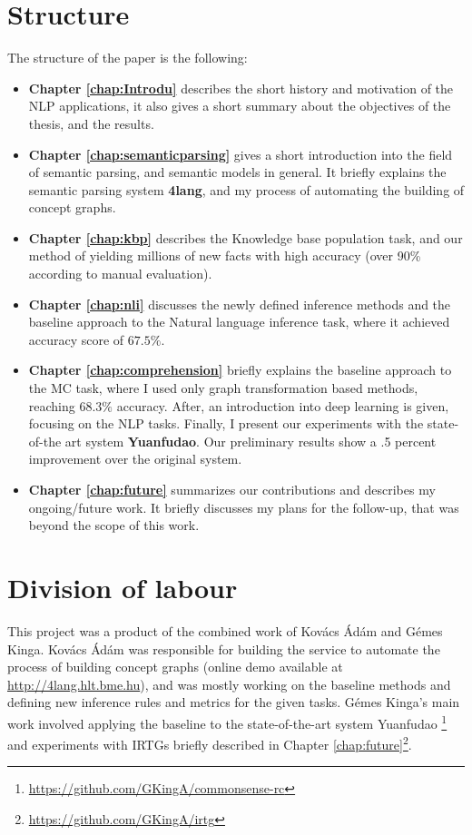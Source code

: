 \section{Structure}
The structure of the paper is the following:
\begin{itemize}
	\item \textbf{Chapter \ref{chap:Introdu}} describes the short history and motivation of the NLP applications, it also gives a short summary about the objectives of the thesis, and the results.
	\item \textbf{Chapter \ref{chap:semanticparsing}} gives a short introduction into the field of semantic parsing, and semantic models in general. It briefly explains the semantic parsing system \textbf{4lang}, and my process of automating the building of concept graphs.
	\item \textbf{Chapter \ref{chap:kbp}} describes the Knowledge base population task, and our method of yielding millions of new facts with high accuracy (over 90\% according to manual evaluation).
	\item \textbf{Chapter \ref{chap:nli}} discusses the newly defined inference methods and the baseline approach to the Natural language inference task, where it achieved accuracy score of $67.5\%$.
	\item \textbf{Chapter \ref{chap:comprehension}} briefly explains the baseline approach to the MC task, where I used only graph transformation based methods, reaching $68.3\%$ accuracy. After, an introduction into deep learning is given, focusing on the NLP tasks. Finally, I present our experiments with the state-of-the art system \textbf{Yuanfudao}. Our preliminary results show a .5 percent improvement over the original system.
	\item \textbf{Chapter \ref{chap:future}} summarizes our contributions and describes my ongoing/future work. It briefly discusses my plans for the follow-up, that was beyond the scope of this work.
\end{itemize}

\section{Division of labour}
This project was a product of the combined work of Kov\'acs \'Ad\'am and G\'emes Kinga. Kov\'acs \'Ad\'am was responsible for building the service to automate the process of building concept graphs (online demo available at \url{http://4lang.hlt.bme.hu}), and was mostly working on the baseline methods and defining new inference rules and metrics for the given tasks. G\'emes Kinga's main work involved applying the baseline to the state-of-the-art system Yuanfudao \cite{Wang:2018}\footnote{\url{https://github.com/GKingA/commonsense-rc}} and experiments with IRTGs briefly described in Chapter \ref{chap:future}\footnote{\url{https://github.com/GKingA/irtg}}.